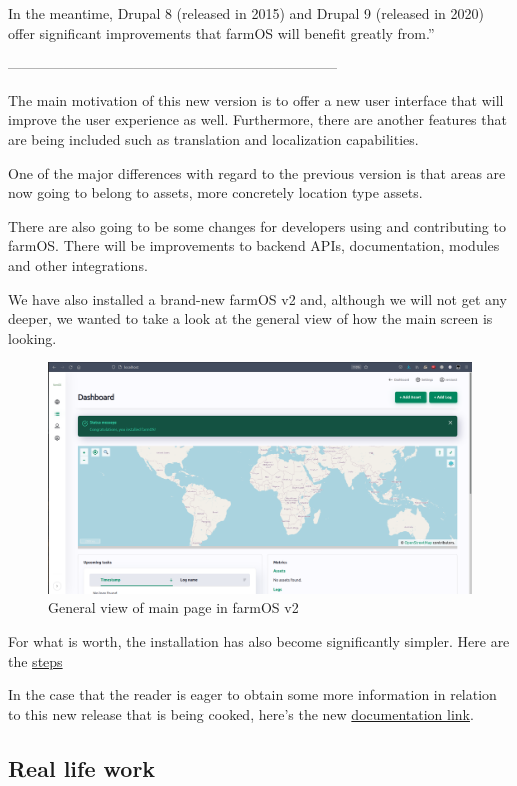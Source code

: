 In the meantime, Drupal 8 (released in 2015) and Drupal 9 (released in 2020) offer significant improvements that farmOS will benefit greatly from.''

-----------------------------------------------------------------------
\vspace{3mm}

The main motivation\cite{farmosv2} of this new version is to offer a new user interface that will improve the user experience as well. Furthermore, there are another features that are being included such as translation and localization capabilities.

One of the major differences with regard to the previous version is that areas are now going to belong to assets, more concretely location type assets.

There are also going to be some changes for developers using and contributing to farmOS. There will be improvements to backend APIs, documentation, modules and other integrations.

We have also installed a brand-new farmOS v2 and, although we will not get any deeper, we wanted to take a look at the general view of how the main screen is looking.

\vspace{3mm}

\begin{figure}[H]
    \centering
    \includegraphics[width=1.07\textwidth]{fig/brandnew-farmosv2.png}
    \caption{General view of main page in farmOS v2}
    \label{fig:brandnew-farmosv2}
\end{figure}

\vspace{3mm}

For what is worth, the installation has also become significantly simpler. Here are the \href{https://docs.farmos.org/development/environment/}{steps}

In the case that the reader is eager to obtain some more information in relation to this new release that is being cooked, here's the new \href{https://docs.farmos.org/model/}{documentation link}.

\subsection{Real life work}
